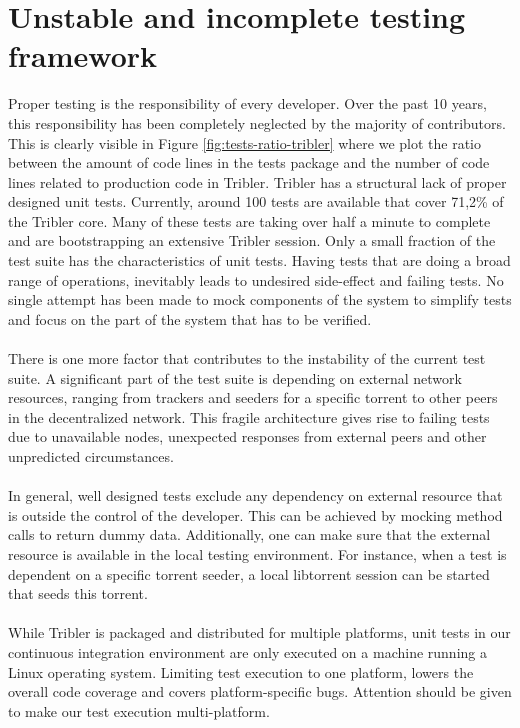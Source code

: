 \section{Unstable and incomplete testing framework}
Proper testing is the responsibility of every developer. Over the past 10 years, this responsibility has been completely neglected by the majority of contributors. This is clearly visible in Figure \ref{fig:tests-ratio-tribler} where we plot the ratio between the amount of code lines in the tests package and the number of code lines related to production code in Tribler. Tribler has a structural lack of proper designed unit tests. Currently, around 100 tests are available that cover 71,2\% of the Tribler core. Many of these tests are taking over half a minute to complete and are bootstrapping an extensive Tribler session. Only a small fraction of the test suite has the characteristics of unit tests. Having tests that are doing a broad range of operations, inevitably leads to undesired side-effect and failing tests. No single attempt has been made to mock components of the system to simplify tests and focus on the part of the system that has to be verified.\\\\
There is one more factor that contributes to the instability of the current test suite. A significant part of the test suite is depending on external network resources, ranging from trackers and seeders for a specific torrent to other peers in the decentralized network. This fragile architecture gives rise to failing tests due to unavailable nodes, unexpected responses from external peers and other unpredicted circumstances.\\\\
In general, well designed tests exclude any dependency on external resource that is outside the control of the developer. This can be achieved by mocking method calls to return dummy data. Additionally, one can make sure that the external resource is available in the local testing environment. For instance, when a test is dependent on a specific torrent seeder, a local libtorrent session can be started that seeds this torrent.\\\\
While Tribler is packaged and distributed for multiple platforms, unit tests in our continuous integration environment are only executed on a machine running a Linux operating system. Limiting test execution to one platform, lowers the overall code coverage and covers platform-specific bugs. Attention should be given to make our test execution multi-platform.

